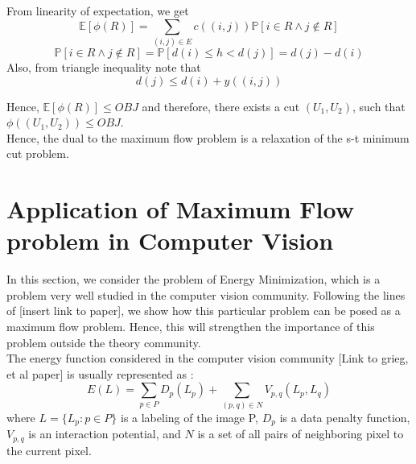 \documentclass[BTech]{iitmdiss}
\begin{document}
	  From linearity of expectation, we get
	  $$\mathbb{E}[\phi(R)] = \displaystyle\sum_{(i,j) \in E} c((i,j)) \mathbb{P}[i \in R \wedge j \notin R]$$
	  $$\mathbb{P}[i \in R \wedge j \notin R] = \mathbb{P}[d(i) \leq h < d(j)] = d(j)-d(i)$$
	  Also, from triangle inequality note that 
	  $$d(j) \leq d(i) + y((i,j))$$
	  
	  Hence, $\mathbb{E}[\phi(R)] \leq OBJ$ and therefore, there exists a cut $(U_1,U_2)$, such that $\phi((U_1, U_2)) \leq OBJ$. \\
	  
	  Hence, the dual to the maximum flow problem is a relaxation of the s-t minimum cut problem.
	  
	  \section{Application of Maximum Flow problem in Computer Vision}
	    In this section, we consider the problem of Energy Minimization, which is a problem very well studied in the computer vision community.
	  Following the lines of [insert link to paper], we show how this particular problem can be posed as a maximum flow problem. Hence, this will
	  strengthen the importance of this problem outside the theory community. \\
	  
	  The energy function considered in the computer vision community [Link to grieg, et al paper] is usually represented as :
	  $$E(L) = \displaystyle\sum_{p \in P} D_{p}(L_{p}) + \displaystyle\sum_{(p,q) \in N} V_{p,q}(L_p, L_q)$$
	  where 
	  $L = \{L_p : p \in P\}$ is a labeling of the image P, $D_p$ is a data penalty function, $V_{p,q}$ is an interaction potential, and 
	  $N$ is a set of all pairs of neighboring pixel to the current pixel. \\
	  
\end{document}

